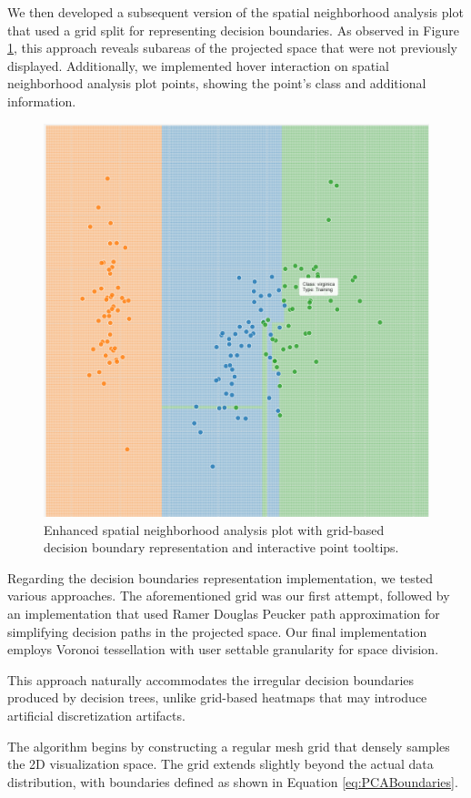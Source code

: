 We then developed a subsequent version of the spatial neighborhood analysis plot \cite{git4commit} that used a grid split for representing decision boundaries. As observed in Figure \ref{fig:secondScatterPlot}, this approach reveals subareas of the projected space that were not previously displayed. Additionally, we implemented hover interaction on spatial neighborhood analysis plot points, showing the point's class and additional information.

\begin{figure}
    \centering
    \includegraphics[width=0.6\linewidth]{images/second scatter plot.png}
    \caption{Enhanced spatial neighborhood analysis plot with grid-based decision boundary representation and interactive point tooltips.}
    \label{fig:secondScatterPlot}
\end{figure}

Regarding the decision boundaries representation implementation, we tested various approaches. The aforementioned grid was our first attempt, followed by an implementation \cite{git5commit} that used Ramer Douglas Peucker path approximation \cite{RAMER1972244, doi:10.3138/FM57-6770-U75U-7727} for simplifying decision paths in the projected space. Our final implementation \cite{git6commit} employs Voronoi tessellation \cite{Pokojski2018141150} with user settable granularity for space division.

This approach naturally accommodates the irregular decision boundaries produced by decision trees, unlike grid-based heatmaps that may introduce artificial discretization artifacts.

The algorithm begins by constructing a regular mesh grid that densely samples the 2D visualization space. The grid extends slightly beyond the actual data distribution, with boundaries defined as shown in Equation \ref{eq:PCABoundaries}.

